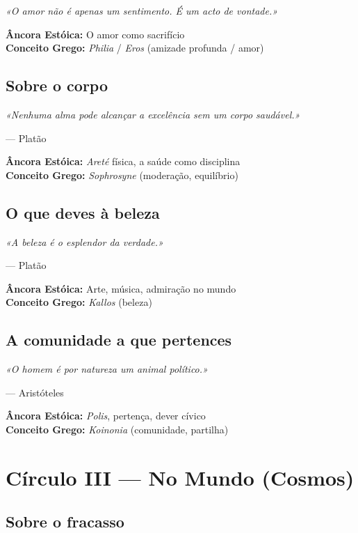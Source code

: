 \documentclass[
  11pt,
  a5paper,
]{book}
\begin{document}
\emph{«O amor não é apenas um sentimento. É um acto de vontade.»}

\textbf{Âncora Estóica:} O amor como sacrifício\\
\textbf{Conceito Grego:} \emph{Philia} / \emph{Eros} (amizade profunda /
amor)

\chapter{Sobre o corpo}\label{sobre-o-corpo}

\emph{«Nenhuma alma pode alcançar a excelência sem um corpo saudável.»}

--- Platão

\textbf{Âncora Estóica:} \emph{Areté} física, a saúde como disciplina\\
\textbf{Conceito Grego:} \emph{Sophrosyne} (moderação, equilíbrio)

\chapter{O que deves à beleza}\label{o-que-deves-uxe0-beleza}

\emph{«A beleza é o esplendor da verdade.»}

--- Platão

\textbf{Âncora Estóica:} Arte, música, admiração no mundo\\
\textbf{Conceito Grego:} \emph{Kallos} (beleza)

\chapter{A comunidade a que
pertences}\label{a-comunidade-a-que-pertences}

\emph{«O homem é por natureza um animal político.»}

--- Aristóteles

\textbf{Âncora Estóica:} \emph{Polis}, pertença, dever cívico\\
\textbf{Conceito Grego:} \emph{Koinonia} (comunidade, partilha)

\part{Círculo III --- No Mundo (Cosmos)}

\chapter{Sobre o fracasso}\label{sobre-o-fracasso}
\end{document}
